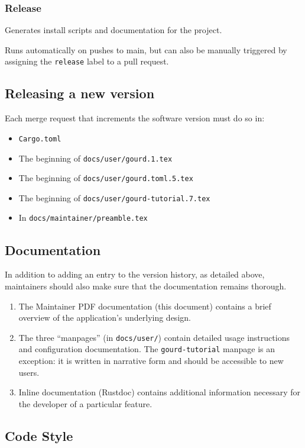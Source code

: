 \subsubsection{Release}
Generates install scripts and documentation for the project.

Runs automatically on pushes to main, but can also be manually triggered by assigning the \texttt{release} label to a pull request.

\subsection{Releasing a new version}

Each merge request that increments the software version must do so in:

\begin{itemize}
  \item \texttt{Cargo.toml}
  \item The beginning of \texttt{docs/user/gourd.1.tex}
  \item The beginning of \texttt{docs/user/gourd.toml.5.tex}
  \item The beginning of \texttt{docs/user/gourd-tutorial.7.tex}
  \item In \texttt{docs/maintainer/preamble.tex}
\end{itemize}

\subsection{Documentation}

In addition to adding an entry to the version history, as detailed above, maintainers should also make sure that the
documentation remains thorough.
\begin{enumerate}
  \item The Maintainer PDF documentation (this document) contains a brief overview of the application's underlying design.
  \item The three ``manpages'' (in \verb|docs/user/|) contain detailed usage instructions and configuration documentation.
    The \texttt{gourd-tutorial} manpage is an exception: it is written in narrative form and should be accessible to new users.
  \item Inline documentation (Rustdoc) contains additional information necessary for the developer of a particular feature.
\end{enumerate}

\subsection{Code Style}

